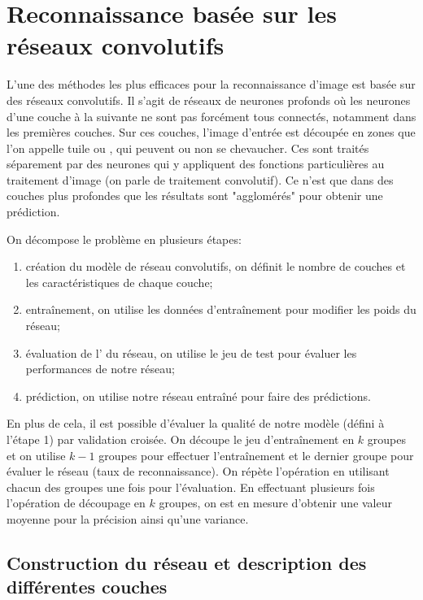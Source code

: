 
\chapter{Reconnaissance basée sur les réseaux convolutifs}

L'une des méthodes les plus efficaces pour la reconnaissance 
d'image est basée sur des réseaux convolutifs. 
Il s'agit de réseaux de neurones profonds où les neurones 
d'une couche à la suivante ne sont pas forcément tous connectés, 
notamment dans les premières couches.
Sur ces couches, l'image d'entrée est découpée en zones que l'on 
appelle tuile ou , qui peuvent ou non se chevaucher.
Ces  sont traités séparement par des neurones qui 
y appliquent des fonctions particulières au traitement d'image
(on parle de traitement convolutif).
Ce n'est que dans des couches plus profondes que les résultats 
sont "agglomérés" pour obtenir une prédiction.

On décompose le problème en plusieurs étapes:
\begin{enumerate}
  \item création du modèle de réseau convolutifs, on définit le nombre de 
  couches et les caractéristiques de chaque couche;
  \item entraînement, on utilise les données d'entraînement pour modifier les 
  poids du réseau;
  \item évaluation de l' du réseau, on utilise le jeu de test 
  pour évaluer les performances de notre réseau;
  \item prédiction, on utilise notre réseau entraîné pour faire des prédictions.
\end{enumerate}

En plus de cela, il est possible d'évaluer la qualité de notre modèle (défini 
à l'étape 1) par validation croisée. 
On découpe le jeu d'entraînement en $k$ groupes et on utilise $k-1$ groupes 
pour effectuer l'entraînement et le dernier groupe pour évaluer le réseau (taux 
de reconnaissance). 
On répète l'opération en utilisant chacun des groupes une fois pour l'évaluation.
En effectuant plusieurs fois l'opération de découpage en $k$ groupes, on 
est en mesure d'obtenir une valeur moyenne pour la précision ainsi qu'une variance. 



\section{Construction du réseau et description des différentes couches}

